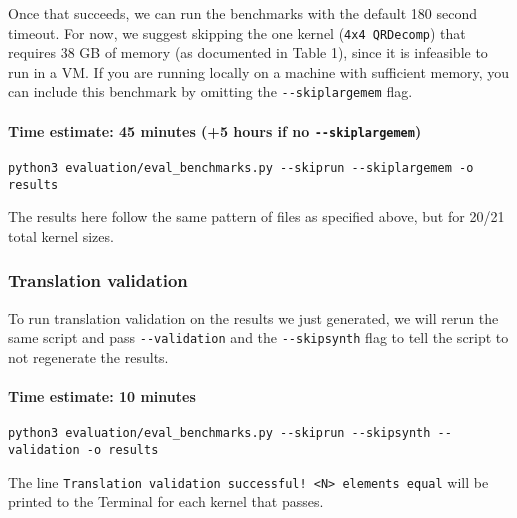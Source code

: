 Once that succeeds, we can run the benchmarks with the default 180
second timeout. For now, we suggest skipping the one kernel
(\texttt{4x4\ QRDecomp}) that requires 38 GB of memory (as documented in
Table 1), since it is infeasible to run in a VM. If you are running
locally on a machine with sufficient memory, you can include this
benchmark by omitting the \texttt{-\/-skiplargemem} flag.

\hypertarget{time-estimate-45-minutes-5-hours-if-no---skiplargemem}{%
\paragraph{\texorpdfstring{Time estimate: 45 minutes (+5 hours if no
\texttt{-\/-skiplargemem})}{Time estimate: 45 minutes (+5 hours if no -\/-skiplargemem)}}\label{time-estimate-45-minutes-5-hours-if-no---skiplargemem}}

\begin{verbatim}
python3 evaluation/eval_benchmarks.py --skiprun --skiplargemem -o results
\end{verbatim}

The results here follow the same pattern of files as specified above,
but for 20/21 total kernel sizes.

\hypertarget{translation-validation}{%
\subsubsection{Translation validation}\label{translation-validation}}

To run translation validation on the results we just generated, we will
rerun the same script and pass \texttt{-\/-validation} and the
\texttt{-\/-skipsynth} flag to tell the script to not regenerate the
results.

\hypertarget{time-estimate-10-minutes}{%
\paragraph{Time estimate: 10 minutes}\label{time-estimate-10-minutes}}

\begin{verbatim}
python3 evaluation/eval_benchmarks.py --skiprun --skipsynth --validation -o results
\end{verbatim}

The line
\texttt{Translation\ validation\ successful!\ \textless{}N\textgreater{}\ elements\ equal}
will be printed to the Terminal for each kernel that passes.


